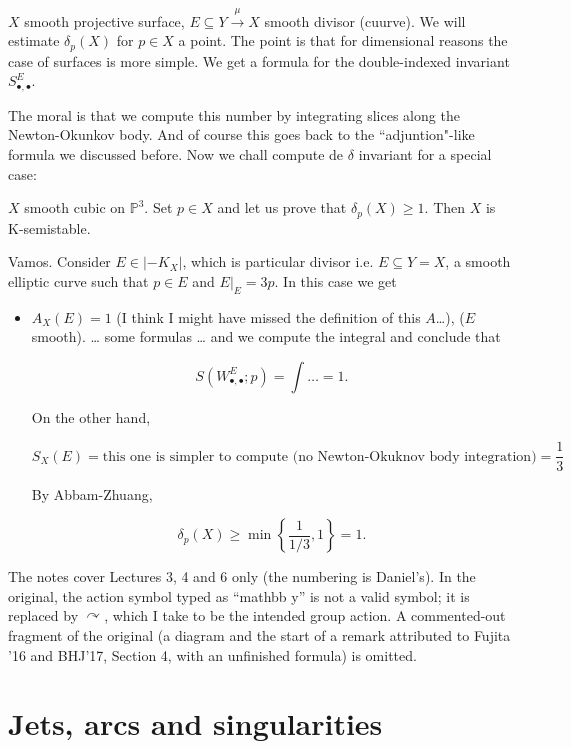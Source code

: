 $X$ smooth projective surface, $E \subseteq Y
\xrightarrow{\mu}X$ smooth divisor (cuurve).
We will estimate $\delta_p(X)$ for $p \in X$
a point. The point is that for dimensional
reasons the case of surfaces is more simple.
We get a formula for the double-indexed
invariant $S_{\bullet,\bullet}^E$.

The moral is that we compute this number by
integrating slices along the Newton-Okunkov
body. And of course this goes back to the
``adjuntion"-like formula we discussed
before. Now we chall compute de $\delta$
invariant for a special case:

\begin{example}
\label{example-montero-5}
$X$ smooth cubic on $\mathbb{P}^3$. Set $p
\in X$ and let us prove that  $\delta_p(X)
\geq  1$. Then $X$ is K-semistable.

Vamos. Consider $E \in |-K_X|$, which is
particular divisor i.e. $E \subseteq Y =X$, a
smooth elliptic curve such that $p \in E $
and $E |_{E}=3p$. In this case we get
\begin{itemize}
\item $A_X(E)=1$ (I think I might have missed
the definition of this $A$\ldots{}), ($E$
smooth). \ldots{} some formulas \ldots{} and
we compute the integral and conclude that

$$
S(W_{\bullet,\bullet}^E;p)= \int \ldots =1.
$$

On the other hand,

$$
S_X(E)=\text{this one is simpler to compute
(no Newton-Okuknov body integration)}
=\frac{1}{3}
$$

By Abbam-Zhuang,

$$
\delta_p(X) \geq \operatorname{min}\left\{
\frac{1}{1/3},1 \right\} =1.
$$

\end{itemize}
\end{example}

\medskip{} The
notes cover Lectures 3, 4 and 6 only (the
numbering is Daniel's). In the original, the
action symbol typed as ``mathbb y'' is not
a valid symbol; it is replaced by
$\curvearrowright$, which I take to be the
intended group action. A commented-out
fragment of the original (a diagram and the
start of a remark attributed to Fujita '16
and
BHJ'17, Section 4, with an unfinished
formula)
is omitted.

\section{Jets, arcs and singularities}
\label{section-badur-jets-arcs}

